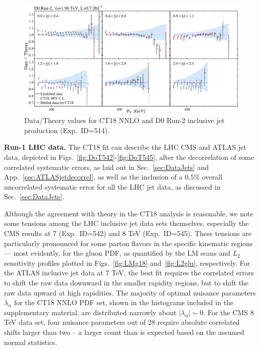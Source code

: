 \begin{figure}[p]
	\includegraphics[width=1.0\textwidth]{./fig/data_514_CT18__com_DoT_hori_ect.pdf}
	\caption{$\mathrm{Data}/\mathrm{Theory}$ values for CT18 NNLO and D0 Run-2 inclusive jet production (Exp.~ID=514).
	     \label{fig:id514}}
	
\end{figure}


%
{\bf Run-1 LHC data.}
%
%
The CT18 fit can describe the LHC CMS and ATLAS jet data, depicted in Figs.~\ref{fig:DoT542}-\ref{fig:DoT545},
after the decorrelation of some correlated systematic errors, as 
laid out in Sec.~\ref{sec:DataJets} and App.~\ref{sec:ATLASjetdecorrel}, 
as well as the inclusion of a $0.5\%$ overall uncorrelated 
systematic error for all the LHC jet data,
as discussed in Sec.~\ref{sec:DataJets}.

%
Although the agreement with theory in the CT18 analysis is reasonable, 
we note some tensions among the LHC inclusive jet data sets themselves, especially the CMS 
results at 7 (Exp.~ID=542) and 8 TeV (Exp.~ID=545).
%
These tensions are particularly pronounced for some parton flavors in the specific kinematic regions --- most evidently, for the gluon PDF, as
quantified by the LM scans and $L_2$ sensitivity profiles plotted 
in Figs.~\ref{fig:LMg18} and~\ref{fig:L2glu}, respectively.
For the ATLAS inclusive jet data at 7 TeV, the best fit requires
the correlated errors to shift the raw data downward
in the smaller rapidity regions, but to shift the raw data upward at high rapidities. The majority of optimal nuisance 
parameters $\lambda_{\alpha}$ for the CT18 NNLO PDF set, shown in the histograms included in the supplementary material, are distributed 
narrowly about $|\lambda_{\alpha}|\! \sim\! 0$. For the CMS 8 TeV data set, four nuisance parameters out of 28 require absolute correlated shifts larger than two -- a larger count than is expected based on the assumed normal statistics. 


